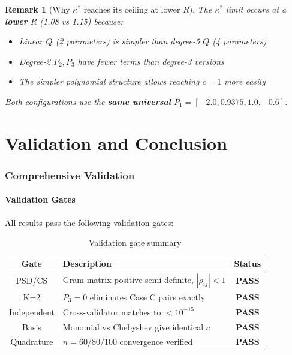\documentclass[11pt]{article}
\newtheorem{remark}{Remark}
\begin{document}
\begin{remark}[Why $\kappa^*$ reaches its ceiling at lower $R$]
The $\kappa^*$ limit occurs at a \textbf{lower} $R$ (1.08 vs 1.15) because:
\begin{itemize}
\item Linear $Q$ (2 parameters) is simpler than degree-5 $Q$ (4 parameters)
\item Degree-2 $P_2, P_3$ have fewer terms than degree-3 versions
\item The simpler polynomial structure allows reaching $c = 1$ more easily
\end{itemize}
Both configurations use the \textbf{same universal} $P_1 = [-2.0, 0.9375, 1.0, -0.6]$.
\end{remark}


\part{Validation and Conclusion}

\section{Comprehensive Validation}
\label{sec:validation}

\subsection{Validation Gates}

All results pass the following validation gates:

\begin{table}[h]
\centering
\caption{Validation gate summary}
\begin{tabular}{clc}
\toprule
Gate & Description & Status \\
\midrule
PSD/CS & Gram matrix positive semi-definite, $|\rho_{ij}| < 1$ & \textbf{PASS} \\
K=2 & $P_3 = 0$ eliminates Case C pairs exactly & \textbf{PASS} \\
Independent & Cross-validator matches to $< 10^{-15}$ & \textbf{PASS} \\
Basis & Monomial vs Chebyshev give identical $c$ & \textbf{PASS} \\
Quadrature & $n=60/80/100$ convergence verified & \textbf{PASS} \\
\bottomrule
\end{tabular}
\end{table}
\end{document}
